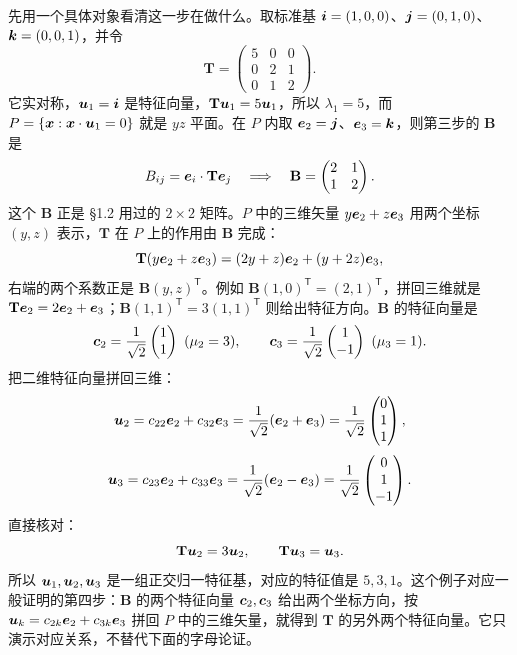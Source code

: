 \documentclass[11pt]{ctexart}
\newcommand{\ten}[1]{\mathbf{#1}}
\newcommand{\step}[1]{\par\smallskip\noindent{\color{violetdeep}\bfseries #1}\hspace{0.35em}}
\begin{document}
\step{第四步：在平面内用 $2\times2$ 引理。}

先用一个具体对象看清这一步在做什么。取标准基 $\boldsymbol{i}=(1,0,0)$、$\boldsymbol{j}=(0,1,0)$、$\boldsymbol{k}=(0,0,1)$，并令
\[
\ten T=\begin{pmatrix}5&0&0\\0&2&1\\0&1&2\end{pmatrix}.
\]
它实对称，$\boldsymbol{u}_1=\boldsymbol{i}$ 是特征向量，$\ten T\vect u_1=5\vect u_1$，所以 $\lambda_1=5$，而 $P=\{\boldsymbol{x}:\boldsymbol{x}\cdot\boldsymbol{u}_1=0\}$ 就是 $yz$ 平面。在 $P$ 内取 $\boldsymbol{e}_2=\boldsymbol{j}$、$\boldsymbol{e}_3=\boldsymbol{k}$，则第三步的 $\ten B$ 是
\[
B_{ij}=\vect e_i\cdot\ten T\vect e_j
\quad\Longrightarrow\quad
\ten B=\begin{pmatrix}2&1\\1&2\end{pmatrix}.
\]
这个 $\ten B$ 正是 §1.2 用过的 $2\times2$ 矩阵。$P$ 中的三维矢量 $y\boldsymbol{e}_2+z\boldsymbol{e}_3$ 用两个坐标 $(y,z)$ 表示，$\ten T$ 在 $P$ 上的作用由 $\ten B$ 完成：
\[
\ten T(y\vect e_2+z\vect e_3)
=(2y+z)\vect e_2+(y+2z)\vect e_3,
\]
右端的两个系数正是 $\ten B(y,z)^{\mathsf T}$。例如 $\ten B(1,0)^{\mathsf T}=(2,1)^{\mathsf T}$，拼回三维就是 $\ten T\vect e_2=2\vect e_2+\vect e_3$；$\ten B(1,1)^{\mathsf T}=3(1,1)^{\mathsf T}$ 则给出特征方向。$\ten B$ 的特征向量是
\[
\vect c_2=\frac{1}{\sqrt2}\begin{pmatrix}1\\1\end{pmatrix}\ (\mu_2=3),
\qquad
\vect c_3=\frac{1}{\sqrt2}\begin{pmatrix}1\\-1\end{pmatrix}\ (\mu_3=1).
\]
把二维特征向量拼回三维：
\[
\boldsymbol{u}_2=c_{22}\boldsymbol{e}_2+c_{32}\boldsymbol{e}_3
=\frac{1}{\sqrt2}(\boldsymbol{e}_2+\boldsymbol{e}_3)
=\frac{1}{\sqrt2}\begin{pmatrix}0\\1\\1\end{pmatrix},
\]
\[
\boldsymbol{u}_3=c_{23}\boldsymbol{e}_2+c_{33}\boldsymbol{e}_3
=\frac{1}{\sqrt2}(\boldsymbol{e}_2-\boldsymbol{e}_3)
=\frac{1}{\sqrt2}\begin{pmatrix}0\\1\\-1\end{pmatrix}.
\]
直接核对：
\[
\ten T\vect u_2=3\vect u_2,\qquad
\ten T\vect u_3=\vect u_3 .
\]
所以 $\boldsymbol{u}_1,\boldsymbol{u}_2,\boldsymbol{u}_3$ 是一组正交归一特征基，对应的特征值是 $5,3,1$。这个例子对应一般证明的第四步：$\ten B$ 的两个特征向量 $\boldsymbol{c}_2,\boldsymbol{c}_3$ 给出两个坐标方向，按 $\boldsymbol{u}_k=c_{2k}\boldsymbol{e}_2+c_{3k}\boldsymbol{e}_3$ 拼回 $P$ 中的三维矢量，就得到 $\ten T$ 的另外两个特征向量。它只演示对应关系，不替代下面的字母论证。
\end{document}

